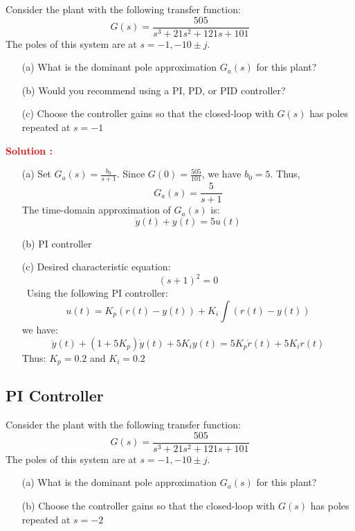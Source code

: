 \documentclass[12pt]{article}
\begin{document}
Consider the plant with the following transfer function:
\begin{equation}
    G(s) = \frac{505}{s^3+21s^2+121s+101}
\end{equation}
The poles of this system are at \(s = -1, -10 \pm j\).
\begin{itemize}
    \item[(a)] What is the dominant pole approximation \(G_a(s)\) for this plant?
    \item[(b)] Would you recommend using a PI, PD, or PID controller?
    \item[(c)] Choose the controller gains so that the closed-loop with \(G(s)\) has poles repeated at \(s = -1\)
\end{itemize}
\textbf{\textcolor{red}{Solution :}} 
\begin{itemize}
    \item[(a)] Set \(G_a(s) = \frac{b_0}{s+1}\). Since \(G(0) = \frac{505}{101}\), we have \(b_0 = 5\). Thus,
\begin{equation}
    G_a(s) = \frac{5}{s+1}
\end{equation}
The time-domain approximation of \(G_a(s)\) is:
\begin{equation}
    \dot{y}(t) + y(t) = 5 u(t)
\end{equation}
    \item[(b)]  PI controller
    \item[(c)] Desired characteristic equation:
    \[ (s+1)^2 = 0\]\
    Using the following PI controller:
    \[u(t) = K_p (r(t)-y(t)) + K_i \int (r(t)-y(t))\]
    we have:
    \[\ddot{y}(t) + (1+5K_p)\dot{y}(t) + 5K_i y(t) = 5K_p \dot{r}(t) + 5K_i r(t)\]
    Thus:
    \(K_p = 0.2\) and \(K_i = 0.2\)
\end{itemize}
\clearpage

\subsection{PI Controller}

Consider the plant with the following transfer function:
\begin{equation}
    G(s) = \frac{505}{s^3+21s^2+121s+101}
\end{equation}
The poles of this system are at \(s = -1, -10 \pm j\).
\begin{itemize}
    \item[(a)] What is the dominant pole approximation \(G_a(s)\) for this plant?
    \item[(b)] Choose the controller gains so that the closed-loop with \(G(s)\) has poles repeated at \(s = -2\)
\end{itemize}
\end{document}
